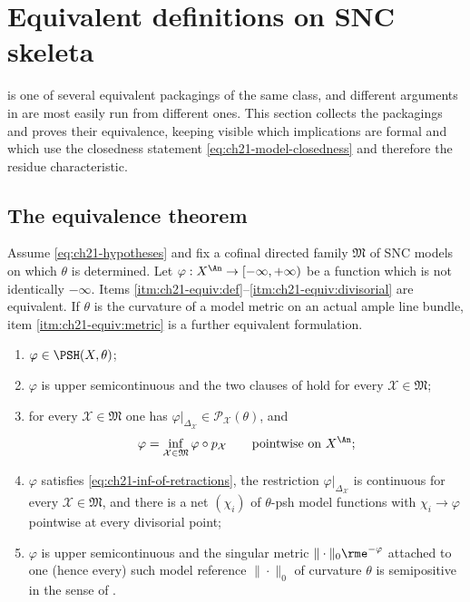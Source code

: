 \section{Equivalent definitions on SNC skeleta}
\label{sec:ch21-equivalent}

 is one of several equivalent packagings of the same
class, and different arguments in  are most easily run from
different ones.  This section collects the packagings and proves their
equivalence, keeping visible which implications are formal and which use the
closedness statement \eqref{eq:ch21-model-closedness} and therefore the
residue characteristic.

\subsection{The equivalence theorem}
\label{sec:ch21-equivalence-theorem}

\begin{theorem}
\label{thm:ch21-equivalent}
Assume \eqref{eq:ch21-hypotheses} and fix a cofinal directed family
$\mathfrak M$ of SNC models on which $\theta$ is determined.  Let
$\varphi:X^{\An}\to[-\infty,+\infty)$ be a function which is not
identically $-\infty$.  Items \cref{itm:ch21-equiv:def}--\cref{itm:ch21-equiv:divisorial}
are equivalent.  If $\theta$ is the curvature of a model metric on an
actual ample line bundle, item \cref{itm:ch21-equiv:metric} is a further
equivalent formulation.

\begin{enumerate}
\item\label{itm:ch21-equiv:def}
$\varphi\in\PSH(X,\theta)$;
\item\label{itm:ch21-equiv:cofinal}
$\varphi$ is upper semicontinuous and the two clauses of
 hold for every $\mathcal X\in\mathfrak M$;
\item\label{itm:ch21-equiv:inf}
for every $\mathcal X\in\mathfrak M$ one has
$\varphi|_{\Delta_{\mathcal X}}\in\mathcal P_{\mathcal X}(\theta)$, and
\begin{equation}
\label{eq:ch21-inf-of-retractions}
 \varphi=\inf_{\mathcal X\in\mathfrak M}\varphi\circ p_{\mathcal X}
 \qquad\text{pointwise on }X^{\An};
\end{equation}
\item\label{itm:ch21-equiv:divisorial}
$\varphi$ satisfies \eqref{eq:ch21-inf-of-retractions}, the restriction
$\varphi|_{\Delta_{\mathcal X}}$ is continuous for every
$\mathcal X\in\mathfrak M$, and there is a net $(\chi_i)$ of
$\theta$-psh model functions with $\chi_i\to\varphi$ pointwise at every
divisorial point;
\item\label{itm:ch21-equiv:metric}
$\varphi$ is upper semicontinuous and the singular metric
$\|\cdot\|_0\rme^{-\varphi}$ attached to one (hence every) such model
reference $\|\cdot\|_0$ of curvature $\theta$ is
semipositive in the sense of .
\end{enumerate}
\end{theorem}

